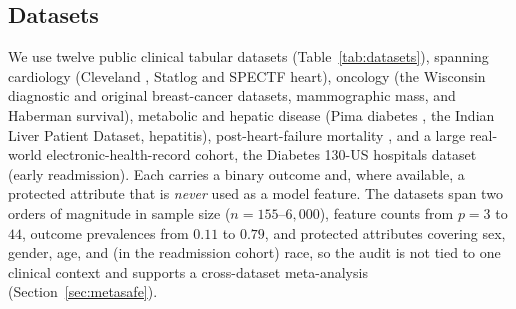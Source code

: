 \documentclass[fleqn,10pt]{wlscirep}
\begin{document}
\subsection{Datasets}
\label{sec:datasets}
We use twelve public clinical tabular datasets (Table~\ref{tab:datasets}), spanning cardiology
(Cleveland \cite{detrano1989international}, Statlog and SPECTF heart), oncology (the Wisconsin
diagnostic \cite{street1993nuclear} and original breast-cancer datasets, mammographic mass, and
Haberman survival), metabolic and hepatic disease (Pima diabetes \cite{smith1988using}, the Indian
Liver Patient Dataset, hepatitis), post-heart-failure mortality \cite{chicco2020machine}, and a
large real-world electronic-health-record cohort, the Diabetes 130-US hospitals dataset (early
readmission). Each carries a binary outcome and, where available, a protected attribute that is
\emph{never} used as a model feature. The datasets span two orders of magnitude in sample size
($n=155$--$6{,}000$), feature counts from $p=3$ to $44$, outcome prevalences from $0.11$ to $0.79$,
and protected attributes covering sex, gender, age, and (in the readmission cohort) race, so the
audit is not tied to one clinical context and supports a cross-dataset meta-analysis
(Section~\ref{sec:metasafe}).

\begin{table}[t]
\centering
\caption{Datasets. Prevalence is the positive-class rate; $p$ is the number of model features
(the protected attribute is excluded from the features). All are publicly available; see
Data availability.}
\label{tab:datasets}

\end{table}
\end{document}
